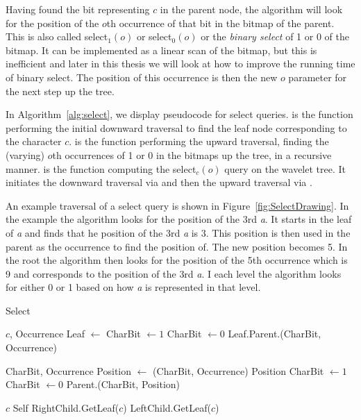 Having found the bit representing $c$ in the parent node, the algorithm will look for the position of the $o$th occurrence of that bit in the bitmap of the parent.
This is also called select$_1(o)$ or select$_0(o)$ or the \textit{binary select} of 1 or 0 of the bitmap.
It can be implemented as a linear scan of the bitmap, but this is inefficient and later in this thesis we will look at how to improve the running time of binary select.
The position of this occurrence is then the new $o$ parameter for the next step up the tree.

In Algorithm~\ref{alg:select}, we display pseudocode for select queries.
 is the function performing the initial downward traversal to find the leaf node corresponding to the character $c$.
 is the function performing the upward traversal, finding the (varying) $o$th occurrences of 1 or 0 in the bitmaps up the tree, in a recursive manner.
 is the function computing the select$_{c}(o)$ query on the wavelet tree.
It initiates the downward traversal via  and then the upward traversal via .

An example traversal of a select query is shown in Figure~\ref{fig:SelectDrawing}.
In the example the algorithm looks for the position of the 3rd \textit{a}.
It starts in the leaf of \textit{a} and finds that he position of the 3rd \textit{a} is 3. 
This position is then used in the parent as the occurrence to find the position of. 
The new position becomes 5.
In the root the algorithm then looks for the position of the 5th occurrence which is 9 and corresponds to the position of the 3rd \textit{a}.
I each level the algorithm looks for either 0 or 1 based on how \textit{a} is represented in that level.

\begin{algorithm}
\caption{Select}
\label{alg:select}
\begin{algorithmic} 
 {$c$, Occurrence}
\State Leaf $\gets$ 
	\State CharBit $\gets 1$
\Else
	\State CharBit $\gets 0$
\EndIf
\State \Return Leaf.Parent.(CharBit, Occurrence)
\EndFunction

\vspace{5mm}

 {CharBit, Occurrence}
\State Position $\gets$ (CharBit, Occurrence)
	\State \Return Position
\EndIf
{}
	\State CharBit $\gets 1$
\Else
	\State CharBit $\gets 0$
\EndIf
\State \Return Parent.(CharBit, Position)
\EndFunction

\vspace{5mm}

 {$c$}
	\State \Return Self
\EndIf
{}
	\State \Return RightChild.GetLeaf($c$)
\Else
	\State \Return LeftChild.GetLeaf($c$)
\EndIf
\EndFunction
\end{algorithmic}
\end{algorithm}

